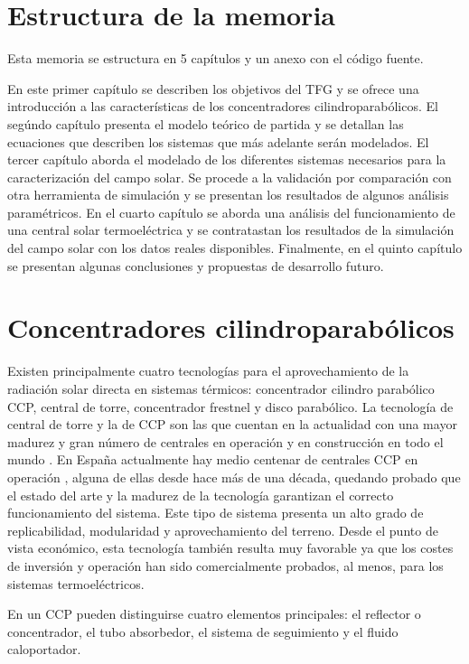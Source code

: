 \section{Estructura de la memoria}
Esta memoria se estructura en 5 capítulos y un anexo con el código fuente.

En este primer capítulo se describen los objetivos del TFG y se ofrece una introducción a las características de los concentradores cilindroparabólicos. 
El segúndo capítulo presenta el modelo teórico de partida y se detallan las ecuaciones que describen los sistemas que más adelante serán modelados.
El tercer capítulo aborda el modelado de los diferentes sistemas necesarios para la caracterización del campo solar. Se procede a la validación por comparación con otra herramienta de simulación y se presentan los resultados de algunos análisis paramétricos.
En el cuarto capítulo se aborda una análisis del funcionamiento de una central solar termoeléctrica y se contratastan los resultados de la simulación del campo solar con los datos reales disponibles.
Finalmente, en el quinto capítulo se presentan algunas conclusiones y propuestas de desarrollo futuro.

\section{Concentradores cilindroparabólicos}

Existen principalmente cuatro tecnologías para el aprovechamiento de la radiación solar directa en sistemas térmicos: concentrador cilindro parabólico CCP, central de torre, concentrador frestnel y disco parabólico. La tecnología de central de torre y la de CCP son las que cuentan en la actualidad con una mayor madurez y gran número de centrales en operación y en construcción en todo el mundo \cite{islamComprehensiveReviewStateoftheart2018}. En España actualmente hay medio centenar de centrales CCP en operación \cite{Protermosolar}, alguna de ellas desde hace más de una década, quedando probado que el estado del arte y la madurez de la tecnología garantizan el correcto funcionamiento del sistema. Este tipo de sistema presenta un alto grado de replicabilidad, modularidad y aprovechamiento del terreno. Desde el punto de vista económico, esta tecnología también resulta muy favorable ya que los costes de inversión y operación han sido comercialmente probados, al menos, para los sistemas termoeléctricos.

En un CCP pueden distinguirse cuatro elementos principales: el reflector o concentrador, el tubo absorbedor, el sistema de seguimiento y el fluido caloportador.

